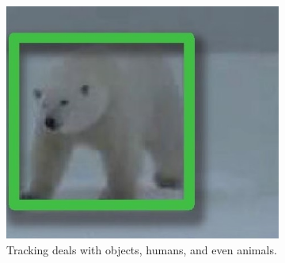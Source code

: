 \begin{figure}[!h]
\begin{subfigure}[!h]{0.54\textwidth}
		\label{fig:challenge_deformation}
	\end{subfigure}
	\begin{subfigure}[!h]{0.24\textwidth}
		\includegraphics[width=\linewidth]{images/tracking/challenge_differentSubject}
		\caption{Tracking deals with objects, humans, and even animals.}
		\label{fig:challenge_differentSubject}
	\end{subfigure}
	\begin{subfigure}[!h]{0.19\textwidth}

\end{subfigure}
\end{figure}
